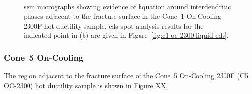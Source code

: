 \begin{figure}
\centering
{} \\
\caption[]{\Gls{sem} micrographs showing evidence of liquation around interdendritic phases adjacent to the fracture surface in the Cone~1 On-Cooling 2300\textdegree{}F hot ductility sample. \Gls{eds} spot analysis results for the indicated point in (b) are given in Figure~\ref{fig:c1-oc-2300-liquid-eds}.}
\label{fig:c1-oc-2300-sem-liquid}
\end{figure}



\subsubsection{Cone~5 On-Cooling}
The region adjacent to the fracture surface of the Cone~5 On-Cooling 2300\textdegree{}F (C5 OC-2300) hot ductility sample is shown in Figure XX. 